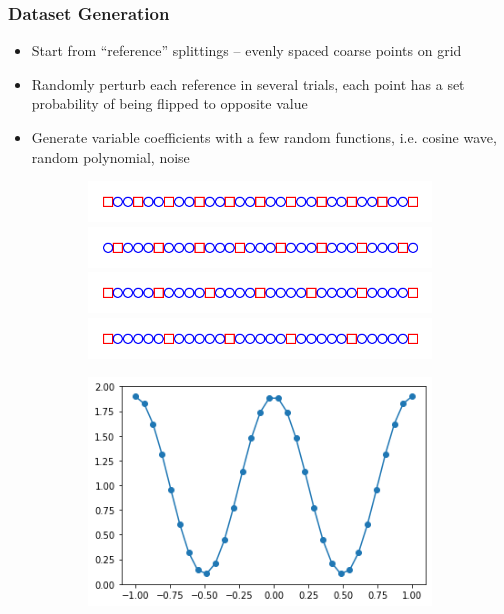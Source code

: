 \documentclass[handout]{beamer}
\begin{document}
\begin{frame}
  \frametitle{Dataset Generation}
  \begin{itemize}
  \item Start from ``reference'' splittings -- evenly spaced coarse points on grid
  \item Randomly perturb each reference in several trials, each point has a set probability of being flipped to opposite value
  \item Generate variable coefficients with a few random functions, i.e. cosine wave, random polynomial, noise
  \end{itemize}
  \begin{figure}[h]
  \centering
  \begin{subfigure}{.48\textwidth}
    \includegraphics[width=\textwidth]{figures/grid1.png}
    \includegraphics[width=\textwidth]{figures/grid2.png}
    \includegraphics[width=\textwidth]{figures/grid3.png}
    \includegraphics[width=\textwidth]{figures/grid4.png}
  \end{subfigure}
  \begin{subfigure}{.48\textwidth}
    \includegraphics[width=\textwidth]{figures/coeff_ex.png}
  \end{subfigure}
  \end{figure}
\end{frame}
\end{document}
